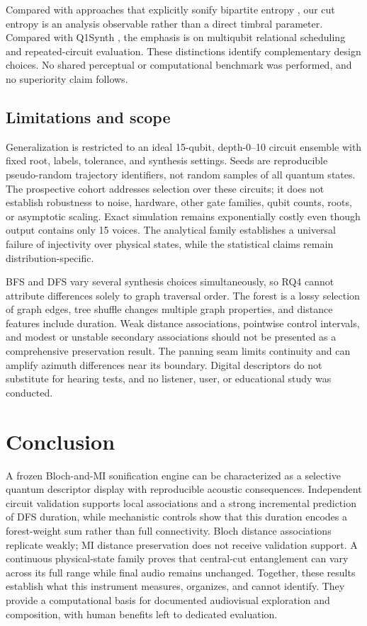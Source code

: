 \documentclass[pdflatex,iicol,sn-basic,Numbered]{sn-jnl}
\begin{document}
Compared with approaches that explicitly sonify bipartite entropy \citep{Tudoce2026}, our cut entropy is an analysis observable rather than a direct timbral parameter. Compared with Q1Synth \citep{Miranda2023}, the emphasis is on multiqubit relational scheduling and repeated-circuit evaluation. These distinctions identify complementary design choices. No shared perceptual or computational benchmark was performed, and no superiority claim follows.

\subsection{Limitations and scope}
Generalization is restricted to an ideal 15-qubit, depth-0--10 circuit ensemble with fixed root, labels, tolerance, and synthesis settings. Seeds are reproducible pseudo-random trajectory identifiers, not random samples of all quantum states. The prospective cohort addresses selection over these circuits; it does not establish robustness to noise, hardware, other gate families, qubit counts, roots, or asymptotic scaling. Exact simulation remains exponentially costly even though output contains only 15 voices. The analytical family establishes a universal failure of injectivity over physical states, while the statistical claims remain distribution-specific.

BFS and DFS vary several synthesis choices simultaneously, so RQ4 cannot attribute differences solely to graph traversal order. The forest is a lossy selection of graph edges, tree shuffle changes multiple graph properties, and distance features include duration. Weak distance associations, pointwise control intervals, and modest or unstable secondary associations should not be presented as a comprehensive preservation result. The panning seam limits continuity and can amplify azimuth differences near its boundary. Digital descriptors do not substitute for hearing tests, and no listener, user, or educational study was conducted.

\section{Conclusion}
A frozen Bloch-and-MI sonification engine can be characterized as a selective quantum descriptor display with reproducible acoustic consequences. Independent circuit validation supports local associations and a strong incremental prediction of DFS duration, while mechanistic controls show that this duration encodes a forest-weight sum rather than full connectivity. Bloch distance associations replicate weakly; MI distance preservation does not receive validation support. A continuous physical-state family proves that central-cut entanglement can vary across its full range while final audio remains unchanged. Together, these results establish what this instrument measures, organizes, and cannot identify. They provide a computational basis for documented audiovisual exploration and composition, with human benefits left to dedicated evaluation.
\end{document}
